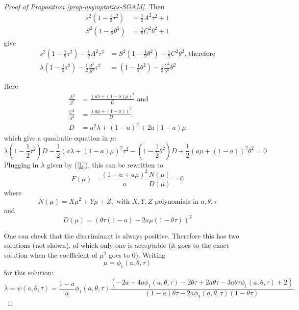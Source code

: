 \documentclass[
]{article}
\theoremstyle{definition}
\theoremstyle{definition}
\theoremstyle{definition}
\theoremstyle{definition}
\theoremstyle{remark}
\begin{document}
\begin{proof}[Proof of Proposition \ref{prop-asymptotics-SGAM}]
Then
\begin{align*}
s^{2}\left(1-\frac{1}{2}\tau^{2}\right) & =\frac{1}{2}A^{2}\tau^{2}+1\\
S^{2}\left(1-\frac{1}{2}\theta^{2}\right) & =\frac{1}{2}C^{2}\theta^{2}+1
\end{align*}
give
\begin{align*}
s^{2}\left(1-\frac{1}{2}\tau^{2}\right)-\frac{1}{2}A^{2}\tau^{2} & =S^{2}\left(1-\frac{1}{2}\theta^{2}\right)-\frac{1}{2}C^{2}\theta^{2}\text{, therefore}\\
\lambda\left(1-\frac{1}{2}\tau^{2}\right)-\frac{1}{2}\frac{A^{2}}{S^{2}}\tau^{2} & =\left(1-\frac{1}{2}\theta^{2}\right)-\frac{1}{2}\frac{C^{2}}{S^{2}}\theta^{2}
\end{align*}

Here
\begin{align*}
\frac{A^{2}}{S^{2}} & =\frac{\left(a\lambda+\left(1-a\right)\mu\right)^{2}}{D}\text{ \ and}\\
\frac{C^{2}}{S^{2}} & =\frac{\left(a\mu+\left(1-a\right)\right)^{2}}{D},\\
D & =a^{2}\lambda+\left(1-a\right)^{2}+2a\left(1-a\right)\mu
\end{align*}
which give a quadratic equation in $\mu$:
\[
\lambda\left(1-\frac{1}{2}\tau^{2}\right)D-\frac{1}{2}\left(a\lambda+\left(1-a\right)\mu\right)^{2}\tau^{2}-\left(1-\frac{1}{2}\theta^{2}\right)D+\frac{1}{2}\left(a\mu+\left(1-a\right)\right)^{2}\theta^{2}=0
\]
Plugging in $\lambda$ given by (\ref{L}), this can be rewritten
to
\[
F\left(\mu\right)=\frac{\left(1-a+a\mu\right)^{2}}{a}\frac{N\left(\mu\right)}{D\left(\mu\right)}=0
\]
where
\[
N\left(\mu\right)=X\mu^{2}+Y\mu+Z,\textrm{ with }X,Y,Z\textrm{ polynomials in }a,\theta,\tau
\]
and
\[
D\left(\mu\right)=\left(\theta\tau\left(1-a\right)-2a\mu\left(1-\theta\tau\right)\right)^{2}
\]

One can check that the discriminant is always positive. Therefore
this has two solutions (not shown), of which only one is acceptable
(it goes to the exact solution when the coefficient of $\mu^{2}$
goes to 0). Writing 
\[
\mu=\phi_{1}(a,\theta,\tau)
\]
 for this solution:
\[
\lambda=\psi\left(a,\theta,\tau\right)=\frac{1-a}{a}\phi_{1}\left(a,\theta,\tau\right)\allowbreak\frac{\left(-2a+4a\phi_{1}\left(a,\theta,\tau\right)-2\theta\tau+2a\theta\tau-3a\theta\tau\phi_{1}\left(a,\theta,\tau\right)+2\right)}{\left(1-a\right)\theta\tau-2a\phi_{1}\left(a,\theta,\tau\right)\left(1-\theta\tau\right)}.
\]


\end{proof}
\end{document}
